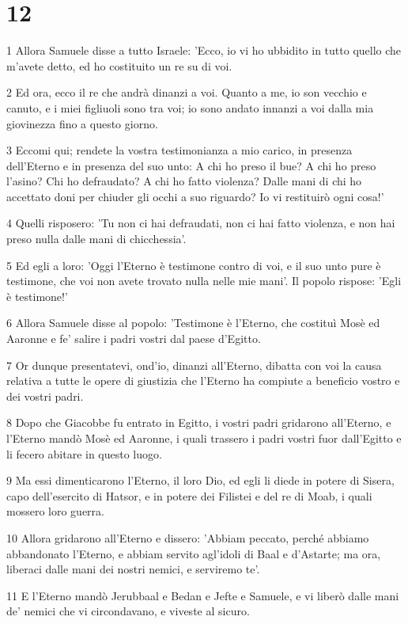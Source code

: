 \chapter{12}

\par 1 Allora Samuele disse a tutto Israele: 'Ecco, io vi ho ubbidito in tutto quello che m'avete detto, ed ho costituito un re su di voi.
\par 2 Ed ora, ecco il re che andrà dinanzi a voi. Quanto a me, io son vecchio e canuto, e i miei figliuoli sono tra voi; io sono andato innanzi a voi dalla mia giovinezza fino a questo giorno.
\par 3 Eccomi qui; rendete la vostra testimonianza a mio carico, in presenza dell'Eterno e in presenza del suo unto: A chi ho preso il bue? A chi ho preso l'asino? Chi ho defraudato? A chi ho fatto violenza? Dalle mani di chi ho accettato doni per chiuder gli occhi a suo riguardo? Io vi restituirò ogni cosa!'
\par 4 Quelli risposero: 'Tu non ci hai defraudati, non ci hai fatto violenza, e non hai preso nulla dalle mani di chicchessia'.
\par 5 Ed egli a loro: 'Oggi l'Eterno è testimone contro di voi, e il suo unto pure è testimone, che voi non avete trovato nulla nelle mie mani'. Il popolo rispose: 'Egli è testimone!'
\par 6 Allora Samuele disse al popolo: 'Testimone è l'Eterno, che costituì Mosè ed Aaronne e fe' salire i padri vostri dal paese d'Egitto.
\par 7 Or dunque presentatevi, ond'io, dinanzi all'Eterno, dibatta con voi la causa relativa a tutte le opere di giustizia che l'Eterno ha compiute a beneficio vostro e dei vostri padri.
\par 8 Dopo che Giacobbe fu entrato in Egitto, i vostri padri gridarono all'Eterno, e l'Eterno mandò Mosè ed Aaronne, i quali trassero i padri vostri fuor dall'Egitto e li fecero abitare in questo luogo.
\par 9 Ma essi dimenticarono l'Eterno, il loro Dio, ed egli li diede in potere di Sisera, capo dell'esercito di Hatsor, e in potere dei Filistei e del re di Moab, i quali mossero loro guerra.
\par 10 Allora gridarono all'Eterno e dissero: 'Abbiam peccato, perché abbiamo abbandonato l'Eterno, e abbiam servito agl'idoli di Baal e d'Astarte; ma ora, liberaci dalle mani dei nostri nemici, e serviremo te'.
\par 11 E l'Eterno mandò Jerubbaal e Bedan e Jefte e Samuele, e vi liberò dalle mani de' nemici che vi circondavano, e viveste al sicuro.
